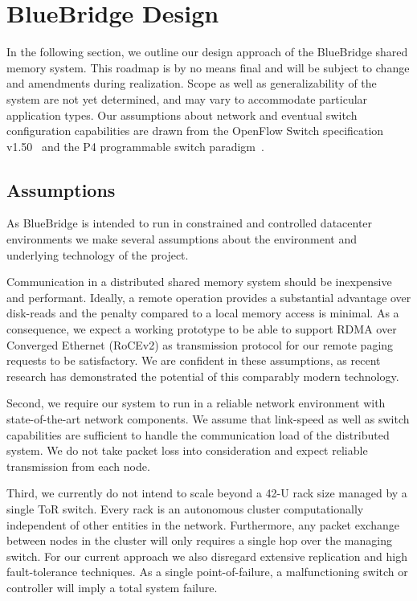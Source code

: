 \section{BlueBridge Design}
\label{sec:overview}
In the following section, we outline our design approach of the BlueBridge shared memory system. This roadmap is by no means final and will be subject to change and amendments during realization. Scope as well as generalizability of the system are not yet determined, and may vary to accommodate particular application types. 
Our assumptions about network and eventual switch configuration capabilities are drawn from the OpenFlow Switch specification v1.50~\cite{ONF_Switch} and the P4 programmable switch paradigm~\cite{p4}.

\subsection{Assumptions}

As BlueBridge is intended to run in constrained and controlled datacenter environments we make several assumptions about the environment and underlying technology of the project.

Communication in a distributed shared memory system should be inexpensive and performant. Ideally, a remote operation provides a substantial advantage over disk-reads and the penalty compared to a local memory access is minimal.
As a consequence, we expect a working prototype to be able to support RDMA over Converged Ethernet (RoCEv2) as transmission protocol for our remote paging requests to be satisfactory. We are confident in these assumptions, as recent research has demonstrated the potential of this comparably modern technology.~\cite{commodityrdma}

Second, we require our system to run in a reliable network environment with state-of-the-art network components. We assume that link-speed as well as switch capabilities are sufficient to handle the communication load of the distributed system. We do not take packet loss into consideration and expect reliable transmission from each node.

Third, we currently do not intend to scale beyond a 42-U rack size managed by a single ToR switch. Every rack is an autonomous cluster computationally independent of other entities in the network. Furthermore, any packet exchange between nodes in the cluster will only requires a single hop over the managing switch. For our current approach we also disregard extensive replication and high fault-tolerance techniques. As a single point-of-failure, a malfunctioning switch or controller will imply a total system failure.

